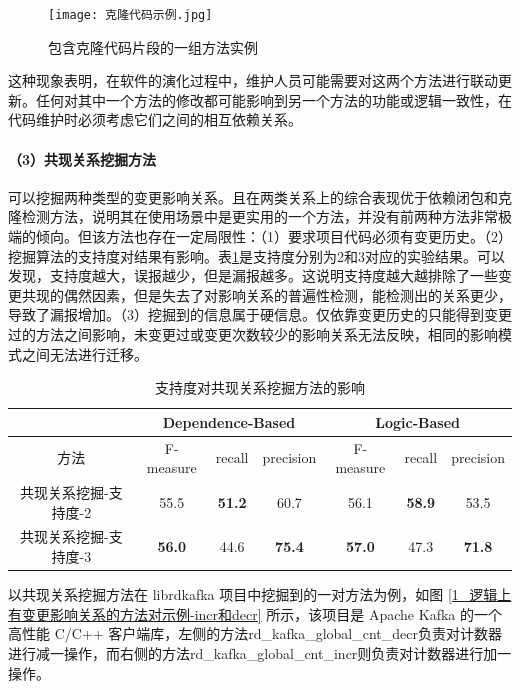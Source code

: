\begin{figure}[h]
\centering
\texttt{[image: 克隆代码示例.jpg]}
\caption{包含克隆代码片段的一组方法实例}
\label{1_包含克隆代码片段的一组方法实例}
\end{figure}

这种现象表明，在软件的演化过程中，维护人员可能需要对这两个方法进行联动更新。任何对其中一个方法的修改都可能影响到另一个方法的功能或逻辑一致性，在代码维护时必须考虑它们之间的相互依赖关系。

\paragraph{（3）共现关系挖掘方法} 可以挖掘两种类型的变更影响关系。且在两类关系上的综合表现优于依赖闭包和克隆检测方法，说明其在使用场景中是更实用的一个方法，并没有前两种方法非常极端的倾向。但该方法也存在一定局限性：（1）要求项目代码必须有变更历史。（2）挖掘算法的支持度对结果有影响。表\ref{1_支持度对共现关系挖掘方法的影响}是支持度分别为2和3对应的实验结果。可以发现，支持度越大，误报越少，但是漏报越多。这说明支持度越大越排除了一些变更共现的偶然因素，但是失去了对影响关系的普遍性检测，能检测出的关系更少，导致了漏报增加。（3）挖掘到的信息属于硬信息。仅依靠变更历史的只能得到变更过的方法之间影响，未变更过或变更次数较少的影响关系无法反映，相同的影响模式之间无法进行迁移。
        
\begin{table}[htbp]
\caption{支持度对共现关系挖掘方法的影响}
\label{1_支持度对共现关系挖掘方法的影响}
\vspace{0.5em}\centering\wuhao
\begin{tabular}{c|ccc|ccc}
\toprule
  & \multicolumn{3}{c|}{Dependence-Based} & \multicolumn{3}{c}{Logic-Based}  \\
\midrule
方法 & F-measure & recall & precision & F-measure & recall & precision  \\
\midrule
共现关系挖掘-支持度-2 & 55.5 & \textbf{51.2} & 60.7 & 56.1 & \textbf{58.9} & 53.5 \\
共现关系挖掘-支持度-3 & \textbf{56.0} & 44.6 & \textbf{75.4} & \textbf{57.0} & 47.3 & \textbf{71.8} \\
\bottomrule
\end{tabular}
\end{table}
   
以共现关系挖掘方法在 librdkafka 项目中挖掘到的一对方法为例，如图 \ref{1_逻辑上有变更影响关系的方法对示例-incr和decr} 所示，该项目是 Apache Kafka 的一个高性能 C/C++ 客户端库，左侧的方法rd\_kafka\_global\_cnt\_decr负责对计数器进行减一操作，而右侧的方法rd\_kafka\_global\_cnt\_incr则负责对计数器进行加一操作。

